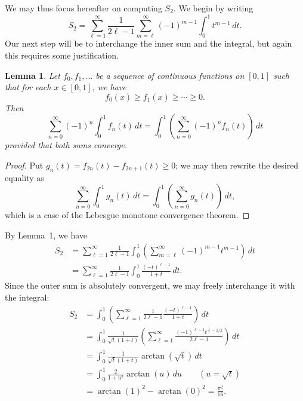 \documentclass[amssymb,twocolumn,pra,10pt,aps]{revtex4-1}
\newtheorem{lemma}{Lemma}
\newcommand{\ee}{\ell}
\begin{document}
\begin{itemize}
We may thus focus hereafter on computing $S_2$. We begin by writing
\[
S_2 = \sum_{\ee=1}^\infty \frac{1}{2\ee-1} \sum_{m=\ee}^\infty (-1)^{m-1} \int_0^1 t^{m-1}\,dt.
\]
Our next step will be to interchange the inner sum and the integral, but again this requires some justification.
\begin{lemma}
Let $f_0, f_1, \dots$ be a sequence of continuous functions on $[0,1]$ such that for each $x \in [0,1]$, we have
\[
f_0(x) \geq f_1(x) \geq \cdots \geq 0.
\]
Then
\[
\sum_{n=0}^\infty (-1)^n \int_0^1 f_n(t)\,dt = \int_0^1 \left( \sum_{n=0}^\infty (-1)^n f_n(t) \right)\,dt
\]
provided that both sums converge.
\end{lemma}
\begin{proof}
Put $g_n(t) = f_{2n}(t) - f_{2n+1}(t) \geq 0$; we may then rewrite the desired equality as
\[
\sum_{n=0}^\infty \int_0^1 g_n(t) \,dt = \int_0^1 \left( \sum_{n=0}^\infty g_n(t) \right)\,dt,
\]
which is a case of the Lebesgue monotone convergence theorem.
\end{proof}
By Lemma~1, we have
\begin{align*}
S_2 &= \sum_{\ee=1}^\infty \frac{1}{2\ee-1} \int_0^1 \left( \sum_{m=\ee}^\infty (-1)^{m-1} t^{m-1} \right) \,dt \\
&=  \sum_{\ee=1}^\infty \frac{1}{2\ee-1} \int_0^1 \frac{(-t)^{\ee-1}}{1+t}  \,dt.
\end{align*}
Since the outer sum is absolutely convergent, we may freely interchange it with the integral:
\begin{align*}
S_2 &=  \int_0^1 \left(
\sum_{\ee=1}^\infty \frac{1}{2\ee-1}  \frac{(-t)^{\ee-1}}{1+t} \right)\,dt \\
&= \int_0^1 \frac{1}{\sqrt{t}(1+t)} \left( \sum_{\ee=1}^\infty \frac{(-1)^{\ee-1} t^{\ee-1/2}}{2\ee-1} \right) \,dt \\
&= \int_0^1 \frac{1}{\sqrt{t}(1+t)} \arctan(\sqrt{t})\,dt \\
&= \int_0^1 \frac{2}{1+u^2} \arctan(u)\,du \qquad (u = \sqrt{t}) \\
&= \arctan(1)^2 - \arctan(0)^2 = \frac{\pi^2}{16}.
\end{align*}

\end{itemize}
\end{document}
